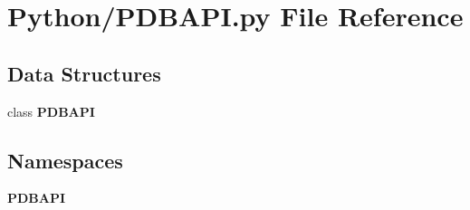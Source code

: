 \section{Python/\+P\+D\+B\+A\+PI.py File Reference}
\label{_p_d_b_a_p_i_8py}
\subsection*{Data Structures}
\begin{DoxyCompactItemize}
\item 
class {\bf P\+D\+B\+A\+PI}
\end{DoxyCompactItemize}
\subsection*{Namespaces}
\begin{DoxyCompactItemize}
\item 
 {\bf P\+D\+B\+A\+PI}
\end{DoxyCompactItemize}
